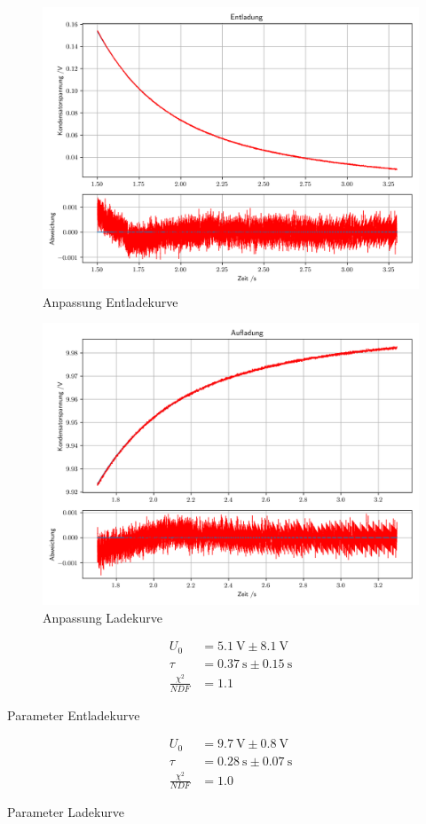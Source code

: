 \documentclass[12pt,twoside,a4paper]{scrartcl}
\begin{document}
				\begin{figure}[H]
					\centering
					\includegraphics[width = 0.8 \textwidth]{Plots/Capacitor/CapacitorEntladung.png}
					\caption{Anpassung Entladekurve}
				\end{figure}
				\begin{figure}[H]
					\centering
					\includegraphics[width = 0.8 \textwidth]{Plots/Capacitor/CapacitorAufladung.png}
					\caption{Anpassung Ladekurve}
				\end{figure}

				\begin{table}[H]
					\centering
					\label{Kondensator::Vergleich}
					\begin{minipage}{0.4 \textwidth}
						\begin{align*}
							U_0 &= \SI{5.1}{\volt} \pm \SI{8.1}{\volt} \\
							\tau &= \SI{0.37}{\second} \pm \SI{0.15}{\second} \\
							\frac{\chi^2}{NDF} &= 1.1
						\end{align*}
						\caption{Parameter Entladekurve}
					\end{minipage}
					\begin{minipage}{0.4 \textwidth}
						 \begin{align*}
							 	U_0 &= \SI{9.7}{\volt} \pm \SI{0.8}{\volt}\\
							 	\tau &= \SI{0.28}{\second} \pm \SI{0.07}{\second}\\
								\frac{\chi^2}{NDF} &= 1.0
						 \end{align*}
						\caption{Parameter Ladekurve}
					\end{minipage}
				\end{table}
\end{document}
